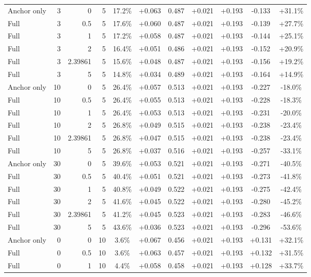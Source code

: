 \begin{table}[htbp]
\begin{tabular}{lrrrccccccc}
Anchor only & 3 & 0 & 5 & 17.2\% & +0.063 & 0.487 & +0.021 & +0.193 & -0.133 & +31.1\% \\
Full & 3 & 0.5 & 5 & 17.6\% & +0.060 & 0.487 & +0.021 & +0.193 & -0.139 & +27.7\% \\
Full & 3 & 1 & 5 & 17.2\% & +0.058 & 0.487 & +0.021 & +0.193 & -0.144 & +25.1\% \\
Full & 3 & 2 & 5 & 16.4\% & +0.051 & 0.486 & +0.021 & +0.193 & -0.152 & +20.9\% \\
Full & 3 & 2.39861 & 5 & 15.6\% & +0.048 & 0.487 & +0.021 & +0.193 & -0.156 & +19.2\% \\
Full & 3 & 5 & 5 & 14.8\% & +0.034 & 0.489 & +0.021 & +0.193 & -0.164 & +14.9\% \\
Anchor only & 10 & 0 & 5 & 26.4\% & +0.057 & 0.513 & +0.021 & +0.193 & -0.227 & -18.0\% \\
Full & 10 & 0.5 & 5 & 26.4\% & +0.055 & 0.513 & +0.021 & +0.193 & -0.228 & -18.3\% \\
Full & 10 & 1 & 5 & 26.4\% & +0.053 & 0.513 & +0.021 & +0.193 & -0.231 & -20.0\% \\
Full & 10 & 2 & 5 & 26.8\% & +0.049 & 0.515 & +0.021 & +0.193 & -0.238 & -23.4\% \\
Full & 10 & 2.39861 & 5 & 26.8\% & +0.047 & 0.515 & +0.021 & +0.193 & -0.238 & -23.4\% \\
Full & 10 & 5 & 5 & 26.8\% & +0.037 & 0.516 & +0.021 & +0.193 & -0.257 & -33.1\% \\
Anchor only & 30 & 0 & 5 & 39.6\% & +0.053 & 0.521 & +0.021 & +0.193 & -0.271 & -40.5\% \\
Full & 30 & 0.5 & 5 & 40.4\% & +0.051 & 0.521 & +0.021 & +0.193 & -0.273 & -41.8\% \\
Full & 30 & 1 & 5 & 40.8\% & +0.049 & 0.522 & +0.021 & +0.193 & -0.275 & -42.4\% \\
Full & 30 & 2 & 5 & 41.6\% & +0.045 & 0.522 & +0.021 & +0.193 & -0.280 & -45.2\% \\
Full & 30 & 2.39861 & 5 & 41.2\% & +0.045 & 0.523 & +0.021 & +0.193 & -0.283 & -46.6\% \\
Full & 30 & 5 & 5 & 43.6\% & +0.036 & 0.523 & +0.021 & +0.193 & -0.296 & -53.6\% \\
Anchor only & 0 & 0 & 10 & 3.6\% & +0.067 & 0.456 & +0.021 & +0.193 & +0.131 & +32.1\% \\
Full & 0 & 0.5 & 10 & 3.6\% & +0.063 & 0.457 & +0.021 & +0.193 & +0.132 & +31.5\% \\
Full & 0 & 1 & 10 & 4.4\% & +0.058 & 0.458 & +0.021 & +0.193 & +0.128 & +33.7\% \\

\end{tabular}
\end{table}
